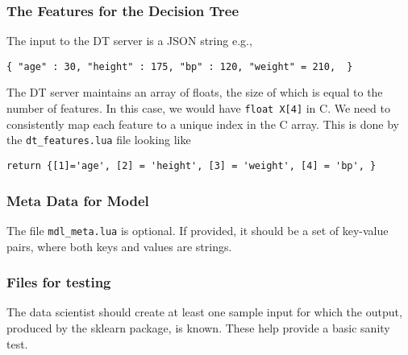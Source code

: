 \subsubsection{The Features for the Decision Tree}
\label{dt_features}

The input to the DT server is a JSON string e.g.,
\begin{verbatim}
{ "age" : 30, "height" : 175, "bp" : 120, "weight" = 210,  }
\end{verbatim}
The DT server maintains an array of floats, the size of which is equal to the
number of features. In this case, we would have \verb+float X[4]+ in C.
We need to consistently map each feature to a unique index in the C array. This is done
by the \verb+dt_features.lua+ file looking like 
\begin{verbatim}
return {[1]='age', [2] = 'height', [3] = 'weight', [4] = 'bp', }
\end{verbatim}

\subsubsection{Meta Data for Model}
\label{mdl_meta}
The file \verb+mdl_meta.lua+ is optional. If provided, it should be 
a set of key-value pairs, where both keys and values are strings. 

\subsubsection{Files for testing}
\label{test_files}
The data scientist should create at least one sample input for which the output,
produced by the sklearn package, is known. These help provide a basic sanity
test. 

